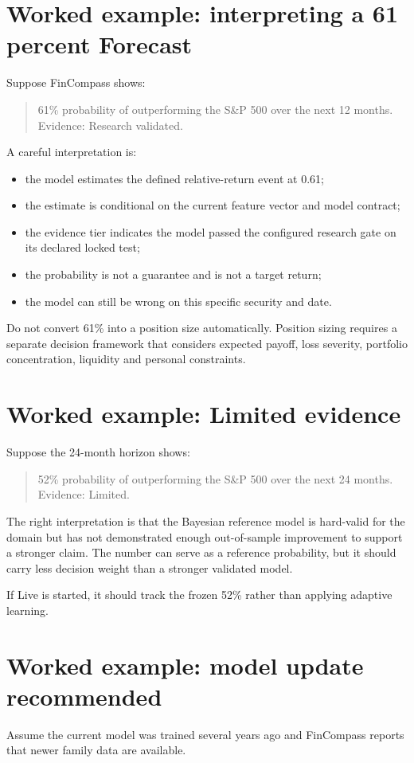 \documentclass[11pt]{article}
\begin{document}
\section{Worked example: interpreting a 61 percent Forecast}
Suppose FinCompass shows:
\begin{quote}
61\% probability of outperforming the S\&P 500 over the next 12 months. Evidence: Research validated.
\end{quote}
A careful interpretation is:
\begin{itemize}[itemsep=0.15em]
\item the model estimates the defined relative-return event at 0.61;
\item the estimate is conditional on the current feature vector and model contract;
\item the evidence tier indicates the model passed the configured research gate on its declared locked test;
\item the probability is not a guarantee and is not a target return;
\item the model can still be wrong on this specific security and date.
\end{itemize}

Do not convert 61\% into a position size automatically. Position sizing requires a separate decision framework that considers expected payoff, loss severity, portfolio concentration, liquidity and personal constraints.

\section{Worked example: Limited evidence}
Suppose the 24-month horizon shows:
\begin{quote}
52\% probability of outperforming the S\&P 500 over the next 24 months. Evidence: Limited.
\end{quote}
The right interpretation is that the Bayesian reference model is hard-valid for the domain but has not demonstrated enough out-of-sample improvement to support a stronger claim. The number can serve as a reference probability, but it should carry less decision weight than a stronger validated model.

If Live is started, it should track the frozen 52\% rather than applying adaptive learning.

\section{Worked example: model update recommended}
Assume the current model was trained several years ago and FinCompass reports that newer family data are available.
\end{document}
